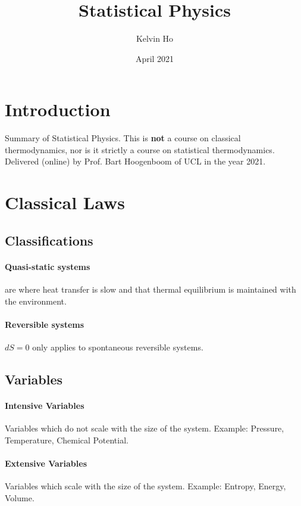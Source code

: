 \documentclass[12pt]{article}
\title{Statistical Physics}
\author{Kelvin Ho}
\date{April 2021}
\begin{document}
\maketitle


\section{Introduction}
Summary of Statistical Physics. This is \textbf{not} a course on classical thermodynamics, nor is it strictly a course on statistical thermodynamics. Delivered (online) by Prof. Bart Hoogenboom of UCL in the year 2021.

\section{Classical Laws}

\subsection{Classifications}

\paragraph{Quasi-static systems} are where heat transfer is slow and that thermal equilibrium is maintained with the environment.

\paragraph{Reversible systems}
$dS = 0$ only applies to spontaneous reversible systems.



\subsection{Variables}
\paragraph{Intensive Variables}
Variables which do not scale with the size of the system. Example: Pressure, Temperature, Chemical Potential.

\paragraph{Extensive Variables}
Variables which scale with the size of the system. Example: Entropy, Energy, Volume.
\end{document}
